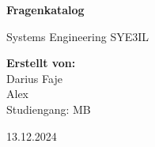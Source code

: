 	\begin{titlepage}
		
		\vspace{2cm}
		\begin{center}
			\Huge
			\textbf{Fragenkatalog}
			\vspace{1cm}
			
			\LARGE
			Systems Engineering SYE3IL
		\end{center}
		
		\vspace{3cm}
		\begin{center}
			\Large
			\textbf{Erstellt von:}\\
			Darius Faje \\ Alex\\
			\vspace{2cm}
			Studiengang: MB
		\end{center}
		
		\vfill
		\begin{center}
			\Large
			13.12.2024
		\end{center}
	\end{titlepage}